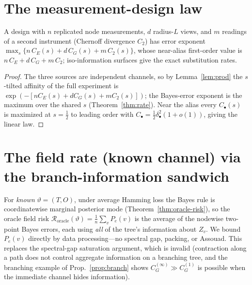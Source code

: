 \documentclass[11pt]{article}
\theoremstyle{plain}
\theoremstyle{definition}\newtheorem{assumption}{Assumption}\newtheorem{remark}{Remark}
\begin{document}
\section{The measurement-design law}\label{sec:design}
\begin{corollary}\label{cor:design}
A design with $n$ replicated node measurements, $d$ radius-$L$ views, and $m$ readings of a second instrument
(Chernoff divergence $C_2$) has error exponent $\max_s\{n\,C_E(s)+d\,C_G(s)+m\,C_2(s)\}$, whose near-alias
first-order value is $n\,C_E+d\,C_G+m\,C_2$; iso-information surfaces give the exact substitution rates.
\end{corollary}
\begin{proof}
The three sources are independent channels, so by Lemma~\ref{lem:prod} the $s$-tilted affinity of the full
experiment is $\exp(-[nC_E(s)+dC_G(s)+mC_2(s)])$; the Bayes-error exponent is the maximum over the shared $s$
(Theorem~\ref{thm:rate}). Near the alias every $C_\bullet(s)$ is maximized at $s=\tfrac12$ to leading order with
$C_\bullet=\tfrac12\delta_\bullet^2(1+o(1))$, giving the linear law.
\end{proof}

\section{The field rate (known channel) via the branch-information sandwich}\label{sec:field}
For \emph{known} $\vartheta=(T,O)$, under average Hamming loss the Bayes rule is coordinatewise marginal posterior
mode (Theorem~\ref{thm:oracle-risk}), so the oracle field risk $\mathcal R_{\mathrm{oracle}}(\vartheta)=\frac1n
\sum_v P_e(v)$ is the average of the nodewise two-point Bayes errors, each using \emph{all} of the tree's
information about $Z_v$. We bound $P_e(v)$ directly by data processing---no spectral gap, packing, or Assouad.
This replaces the spectral-gap saturation argument, which is invalid (contraction along a path does not control
aggregate information on a branching tree, and the branching example of Prop.~\ref{prop:branch} shows
$C_G^{(\infty)}\gg C_G^{(1)}$ is possible when the immediate channel hides information).
\end{document}
